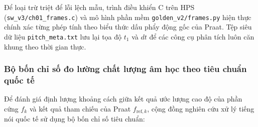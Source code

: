 Để loại trừ triệt để lỗi lệch mẫu, trình điều khiển C trên HPS (\texttt{sw\_v3/}\allowbreak\texttt{ch01\_}\allowbreak\texttt{frames.c}) và mô hình phần mềm \texttt{golden\_v2/}\allowbreak\texttt{frames.py} hiện thực chính xác từng phép tính theo biểu thức dấu phẩy động gốc của Praat. Tệp siêu dữ liệu \texttt{pitch\_meta.txt} lưu lại tọa độ $t_1$ và $dt$ để các công cụ phân tích luôn căn khung theo thời gian thực.

\subsubsection*{Bộ bốn chỉ số đo lường chất lượng âm học theo tiêu chuẩn quốc tế}
Để đánh giá định lượng khoảng cách giữa kết quả ước lượng cao độ của phần cứng $f_k$ và kết quả tham chiếu của Praat $f_{\text{ref}, k}$, cộng đồng nghiên cứu xử lý tiếng nói quốc tế sử dụng bộ bốn chỉ số tiêu chuẩn:

